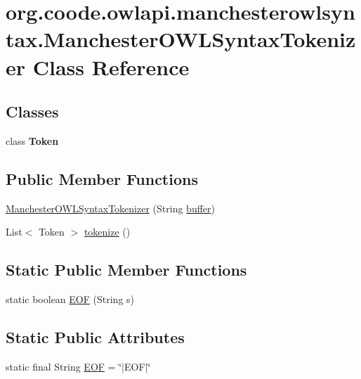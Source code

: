 \hypertarget{classorg_1_1coode_1_1owlapi_1_1manchesterowlsyntax_1_1_manchester_o_w_l_syntax_tokenizer}{\section{org.\-coode.\-owlapi.\-manchesterowlsyntax.\-Manchester\-O\-W\-L\-Syntax\-Tokenizer Class Reference}
\label{classorg_1_1coode_1_1owlapi_1_1manchesterowlsyntax_1_1_manchester_o_w_l_syntax_tokenizer}
}
\subsection*{Classes}
\begin{DoxyCompactItemize}
\item 
class {\bfseries Token}
\end{DoxyCompactItemize}
\subsection*{Public Member Functions}
\begin{DoxyCompactItemize}
\item 
\hyperlink{classorg_1_1coode_1_1owlapi_1_1manchesterowlsyntax_1_1_manchester_o_w_l_syntax_tokenizer_ae49dc1aa63532369e1eec8d5e45e6c83}{Manchester\-O\-W\-L\-Syntax\-Tokenizer} (String \hyperlink{classorg_1_1coode_1_1owlapi_1_1manchesterowlsyntax_1_1_manchester_o_w_l_syntax_tokenizer_ab7d953c443c5bb870ffd378bb37fb230}{buffer})
\item 
List$<$ Token $>$ \hyperlink{classorg_1_1coode_1_1owlapi_1_1manchesterowlsyntax_1_1_manchester_o_w_l_syntax_tokenizer_a86000b35ac769c1ee44f65d9802469f7}{tokenize} ()
\end{DoxyCompactItemize}
\subsection*{Static Public Member Functions}
\begin{DoxyCompactItemize}
\item 
static boolean \hyperlink{classorg_1_1coode_1_1owlapi_1_1manchesterowlsyntax_1_1_manchester_o_w_l_syntax_tokenizer_ae8ecb7a74eafa83fa7ee01b868c9ba05}{E\-O\-F} (String s)
\end{DoxyCompactItemize}
\subsection*{Static Public Attributes}
\begin{DoxyCompactItemize}
\item 
static final String \hyperlink{classorg_1_1coode_1_1owlapi_1_1manchesterowlsyntax_1_1_manchester_o_w_l_syntax_tokenizer_a3148fdc445335cfd4b3dcb98ffd0f26e}{E\-O\-F} = \char`\"{}$|$E\-O\-F$|$\char`\"{}
\end{DoxyCompactItemize}
